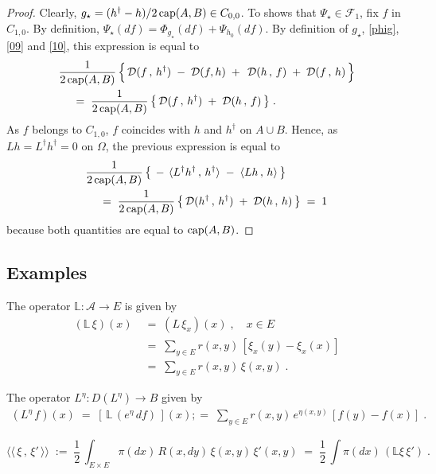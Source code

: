 \documentclass[reqno]{amsart}
\newcounter{as}[section]
\newcommand{\mc}[1]{{\mathcal #1}}
\newcommand{\bb}[1]{{\mathbb #1}}
\newcommand{\ms}[1]{{\mathscr #1}}
\newcommand{\<}{\langle}
\renewcommand{\>}{\rangle}
\renewcommand{\Cap}{{\rm cap}}
\begin{document}
\begin{proof}
Clearly, $g_\star = (h^\dagger - h)/2\, \Cap(A,B) \in C_{0,0}$. To
shows that $\Psi_\star \in \ms F_1$, fix $f$ in $C_{1,0}$. By
definition, $\Psi_\star (df) = \Phi_{g_\star} (df) + \Psi_{h_0} (df)$. By
definition of $g_\star$, \eqref{phig}, \eqref{09} and \eqref{10}, this
expression is equal to
\begin{align*}
& \frac 1{2\, \Cap(A,B)} \, \Big\{\, \mc D (f\,,\, h^\dagger) \;-\; 
\mc D (f,h) \;+\; \, \mc D(h \,,\, f) \;+\; 
\mc D(f \,,\, h)\, \Big\} \\
&\quad \;=\;
\frac 1{2\, \Cap(A,B)} \, \big\{\, \mc D (f\,,\, h^\dagger) \;+\; 
\mc D(h \,,\, f)\, \big\} \;. 
\end{align*}
As $f$ belongs to $C_{1,0}$, $f$ coincides with $h$ and $h^\dagger$ on
$A\cup B$. Hence, as $Lh = L^\dagger h^\dagger = 0$ on $\Omega$, the
previous expression is equal to
\begin{align*}
& \frac 1{2\, \Cap(A,B)} \, \big\{\, -\, \< L^\dagger h^\dagger\,,\,
h^\dagger \> 
\;-\;  \< L h \,,\, h \> \, \big\} \\
&\quad 
\;=\; \frac 1{2\, \Cap(A,B)} \, \big\{\, \mc D (h^\dagger \,,\, h^\dagger) 
\;+\;  \mc D(h \,,\, h)\, \big\} \;=\; 1
\end{align*}
because both quantities are equal to $\Cap (A,B)$.
\end{proof}



\subsection{Examples}

\smallskip{}

The operator $\bb L: \ms A \to E$ is given by
\begin{align*}
(\bb L \, \xi)(x) \; & =\; (L\, \xi_x )(x) \;, \quad x\in E \\
& =\; \sum_{y\in E} r(x,y) \, [\xi_x(y) - \xi_x(x)] \\
& =\; \sum_{y\in E} r(x,y) \, \xi (x,y)  \;.
\end{align*}

The operator $L^\eta :D(L^\eta) \to B$ given by
\begin{align*}
(L^\eta \, f)(x) \;=\; [\, \bb L\, (e^\eta\, df)\,] (x) 
;=\; \sum_{y\in E} r(x,y) \, e^{\eta(x,y)} \, [f(y) - f(x)]\;.
\end{align*}

\begin{equation*}
\<\!\<\, \xi \,,\, \xi' \,\>\!\> \;:=\; \frac 12\, 
\int_{E\times E} \pi(dx)\, R(x,dy) \, \xi(x,y)\, \xi'(x,y) \;=\;
\frac 12\, \int \pi(dx)\, (\bb L \xi\, \xi') \;.
\end{equation*}
\end{document}

